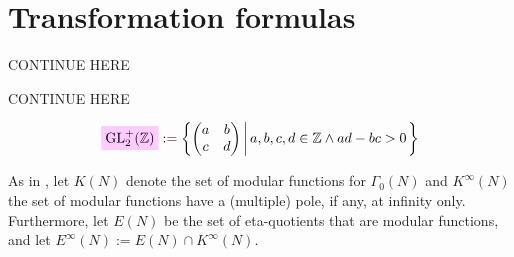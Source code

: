 \documentclass{article}
\begin{document}
\section{Transformation formulas}




\begin{Hemmecke}
  CONTINUE HERE
\end{Hemmecke}
\begin{Hemmecke}
  CONTINUE HERE
\end{Hemmecke}



\begin{Hemmecke}
\begin{gather}
  \defineNotation[GL2+Z]{\mathrm{GL}_2^+(\setZ)}
  :=
  \SetDef{  \begin{pmatrix}
    a & b\\
    c & d
  \end{pmatrix}}{a,b,c,d\in\setZ \land ad-bc>0}
  \label{eq:GL2+Z}
\end{gather}
\end{Hemmecke}







As in \cite{Radu_RamanujanKolberg_2015}, let $K(N)$ denote the set of
modular functions for $\Gamma_0(N)$ and $K^\infty(N)$ the set of
modular functions have a (multiple) pole, if any, at infinity only.
Furthermore, let $E(N)$ be the set of eta-quotients that are
modular functions, and let $E^\infty(N) := E(N)\cap K^\infty(N)$.
\end{document}
